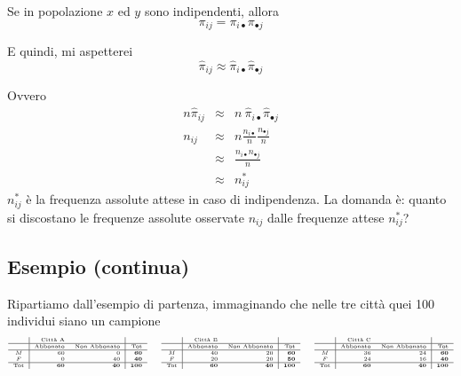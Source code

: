 \documentclass[
  11pt,
]{book}
\theoremstyle{mytheoremstyle}
\theoremstyle{mydefstyle}
\begin{document}
Se in popolazione \(x\) ed \(y\) sono indipendenti, allora
\[\pi_{ij}=\pi_{i\bullet}\pi_{\bullet j}\]

E quindi, mi aspetterei
\[\hat\pi_{ij}\approx\hat\pi_{i\bullet}\hat\pi_{\bullet j}\]

Ovvero
\begin{eqnarray*}
n\hat\pi_{ij}&\approx&n~\hat\pi_{i\bullet}\hat\pi_{\bullet j}\\
n_{ij}  &\approx& n \frac{n_{i\bullet}}{n}\frac{n_{\bullet j}}{n}\\
        &\approx& \frac{n_{i\bullet}n_{\bullet j}}{n}\\
        &\approx& n_{ij}^*
\end{eqnarray*}
\(n^*_{ij}\) è la frequenza assolute attese in caso di indipendenza.
La domanda è: quanto si discostano le frequenze assolute osservate \(n_{ij}\) dalle
frequenze attese \(n_{ij}^*\)?

\subsection{Esempio (continua)}\label{esempio-continua}

Ripartiamo dall'esempio di partenza, immaginando che nelle tre città quei 100
individui siano un campione
\[\tiny
\begin{array}{c|rr|r}
 & \text{Città A} & &\\ \hline
 &\text{Abbonato} &\text{Non Abbonato} &\bf\text{Tot}\\
  \hline
   M & 60 & 0 & \bf 60\\ 
   F & 0 & 40  &\bf 40\\ \hline
  \bf\text{Tot} &\bf 60 &\bf 40 &\bf 100\\ 
\end{array}
\qquad
\begin{array}{c|rr|r}
 & \text{Città B} & &\\ \hline
 &\text{Abbonato} &\text{Non Abbonato} &\bf\text{Tot}\\
  \hline
  M & 40 & 20 & \bf60\\ 
  F & 20 & 20  &\bf50\\ \hline
  \bf\text{Tot} &\bf 60 &\bf 40 &\bf 100\\ 
\end{array}
\qquad
\begin{array}{c|rr|r}
 & \text{Città C} & &\\ \hline
 &\text{Abbonato} &\text{Non Abbonato} &\bf\text{Tot}\\
  \hline
  M & 36 & 24 & \bf60\\ 
  F & 24 & 16  &\bf40\\ \hline
  \bf\text{Tot} &\bf 60 &\bf 40 &\bf 100\\ 
\end{array}
\]
\end{document}
